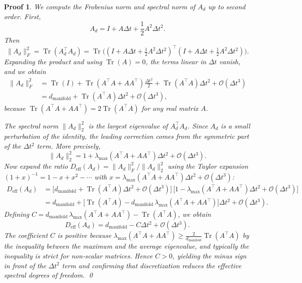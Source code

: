\documentclass[11pt, a4paper]{article}
\theoremstyle{plain}
\newtheorem*{pf}{Proof}
\DeclareMathOperator{\Tr}{Tr}
\begin{document}
\begin{pf}
We compute the Frobenius norm and spectral norm of $A_d$ up to second order. First,
\[
A_d = I + A\Delta t + \frac{1}{2}A^2\Delta t^2.
\]
Then
\[
\|A_d\|_F^2 = \Tr(A_d^\top A_d) = \Tr\Big((I + A\Delta t + \tfrac{1}{2}A^2\Delta t^2)^\top (I + A\Delta t + \tfrac{1}{2}A^2\Delta t^2)\Big).
\]
Expanding the product and using $\Tr(A)=0$, the terms linear in $\Delta t$ vanish, and we obtain
\begin{align*}
\|A_d\|_F^2 &= \Tr(I) + \Tr(A^\top A + A A^\top)\frac{\Delta t^2}{2} + \Tr(A^\top A)\Delta t^2 + \mathcal{O}(\Delta t^3) \\
&= d_{\text{manifold}} + \Tr(A^\top A)\Delta t^2 + \mathcal{O}(\Delta t^3),
\end{align*}
because $\Tr(A^\top A + A A^\top) = 2\Tr(A^\top A)$ for any real matrix $A$.

The spectral norm $\|A_d\|_2^2$ is the largest eigenvalue of $A_d^\top A_d$. Since $A_d$ is a small perturbation of the identity, the leading correction comes from the symmetric part of the $\Delta t^2$ term. More precisely,
\[
\|A_d\|_2^2 = 1 + \lambda_{\max}(A^\top A + A A^\top)\Delta t^2 + \mathcal{O}(\Delta t^3).
\]
Now expand the ratio $D_{\text{eff}}(A_d) = \|A_d\|_F^2 / \|A_d\|_2^2$ using the Taylor expansion $(1+x)^{-1} = 1 - x + x^2 - \cdots$ with $x = \lambda_{\max}(A^\top A + A A^\top)\Delta t^2 + \mathcal{O}(\Delta t^3)$:
\begin{align*}
D_{\text{eff}}(A_d) &= \big[ d_{\text{manifold}} + \Tr(A^\top A)\Delta t^2 + \mathcal{O}(\Delta t^3) \big] \,
\big[ 1 - \lambda_{\max}(A^\top A + A A^\top)\Delta t^2 + \mathcal{O}(\Delta t^3) \big] \\
&= d_{\text{manifold}} + \big[ \Tr(A^\top A) - d_{\text{manifold}} \, \lambda_{\max}(A^\top A + A A^\top) \big] \Delta t^2 + \mathcal{O}(\Delta t^3).
\end{align*}
Defining $C = d_{\text{manifold}} \, \lambda_{\max}(A^\top A + A A^\top) - \Tr(A^\top A)$, we obtain
\[
D_{\text{eff}}(A_d) = d_{\text{manifold}} - C \Delta t^2 + \mathcal{O}(\Delta t^3).
\]
The coefficient $C$ is positive because $\lambda_{\max}(A^\top A + A A^\top) \ge \frac{2}{d_{\text{manifold}}}\Tr(A^\top A)$ by the inequality between the maximum and the average eigenvalue, and typically the inequality is strict for non‑scalar matrices. Hence $C > 0$, yielding the minus sign in front of the $\Delta t^2$ term and confirming that discretization reduces the effective spectral degrees of freedom.
\qed
\end{pf}
\end{document}
